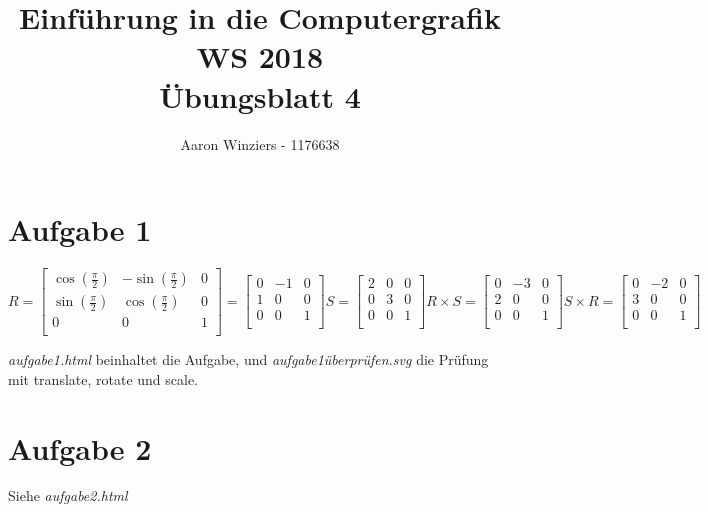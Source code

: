 \documentclass[11pt,a4paper,parskip=half ]{scrartcl}
\author{Aaron Winziers - 1176638}
\title{Einführung in die Computergrafik WS 2018\\\LARGE{Übungsblatt 4}}
\begin{document}
	\maketitle
	
	\section*{Aufgabe 1}
	\begin{center}
		$
		R = 
		\begin{bmatrix}
		\cos(\frac{\pi}{2}) & -\sin(\frac{\pi}{2}) & 0	\\
		\sin(\frac{\pi}{2}) & \cos(\frac{\pi}{2}) & 0	\\
		0 & 0 & 1	\\
		\end{bmatrix} = 
		\begin{bmatrix}
		0 & -1 & 0	\\
		1 & 0 & 0	\\
		0 & 0 & 1	\\
		\end{bmatrix}		
		S = 
		\begin{bmatrix}
		2 & 0 & 0	\\
		0 & 3 & 0	\\
		0 & 0 & 1	\\
		\end{bmatrix}
		R\times S = 
		\begin{bmatrix}
		0 & -3 & 0	\\
		2 & 0 & 0	\\
		0 & 0 & 1	\\
		\end{bmatrix}
		S\times R = 
		\begin{bmatrix}
		0 & -2 & 0	\\
		3 & 0 & 0	\\
		0 & 0 & 1	\\
		\end{bmatrix}
		$
	\end{center}
	\textit{aufgabe1.html} beinhaltet die Aufgabe, und \textit{aufgabe1überprüfen.svg} die Prüfung mit translate, rotate und scale.
	
	\section*{Aufgabe 2}
	Siehe \textit{aufgabe2.html}
	
\end{document}
